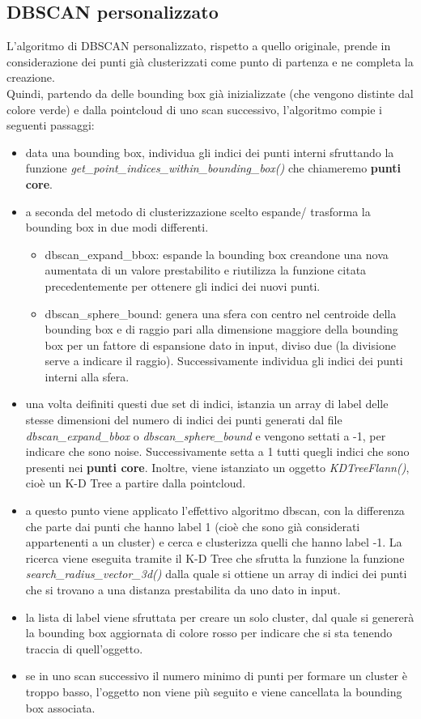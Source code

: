 \documentclass[italian]{report}
\begin{document}
\subsection{DBSCAN personalizzato}
L'algoritmo di DBSCAN personalizzato, rispetto a quello originale, prende in considerazione dei punti già clusterizzati come punto di partenza e ne completa la creazione.\\
Quindi, partendo da delle bounding box già inizializzate (che vengono distinte dal colore verde) e dalla pointcloud di uno scan successivo, l'algoritmo compie i seguenti passaggi:
\begin{itemize}
	\item data una bounding box, individua gli indici dei punti interni sfruttando la funzione \textit{get\_point\_indices\_within\_bounding\_box()} che chiameremo \textbf{punti core}.
	\item a seconda del metodo di clusterizzazione scelto espande/ trasforma la bounding box in due modi differenti.
		\begin{itemize}
			\item dbscan\_expand\_bbox: espande la bounding box creandone una nova aumentata di un valore prestabilito e riutilizza la funzione citata precedentemente per ottenere gli indici dei nuovi punti.
			\item dbscan\_sphere\_bound: genera una sfera con centro nel centroide della bounding box e di raggio pari alla dimensione maggiore della bounding box per un fattore di espansione dato in input, diviso due 					(la divisione serve a indicare il raggio). Successivamente individua gli indici dei punti interni alla sfera.
		\end{itemize}
	\item una volta deifiniti questi due set di indici, istanzia un array di label delle stesse dimensioni del numero di indici dei punti generati dal file \textit{dbscan\_expand\_bbox} o \textit{dbscan\_sphere\_bound} e vengono settati a -1, per indicare che sono noise. Successivamente setta a 1 tutti quegli indici che sono presenti nei \textbf{punti core}. Inoltre, viene istanziato un oggetto \textit{KDTreeFlann()}, cioè un K-D Tree a partire dalla pointcloud.
	\item a questo punto viene applicato l'effettivo algoritmo dbscan, con la differenza che parte dai punti che hanno label 1 (cioè che sono già considerati appartenenti a un cluster) e cerca e clusterizza quelli che hanno label -1. La ricerca viene eseguita tramite il K-D Tree che sfrutta la funzione la funzione \textit{search\_radius\_vector\_3d()} dalla quale si ottiene un array di indici dei punti che si trovano a una distanza prestabilita da uno dato in input.
	\item la lista di label viene sfruttata per creare un solo cluster, dal quale si genererà la bounding box aggiornata di colore rosso per indicare che si sta tenendo traccia di quell'oggetto.
	\item se in uno scan successivo il numero minimo di punti per formare un cluster è troppo basso, l'oggetto non viene più seguito e viene cancellata la bounding box associata.
\end{itemize}
\end{document}
